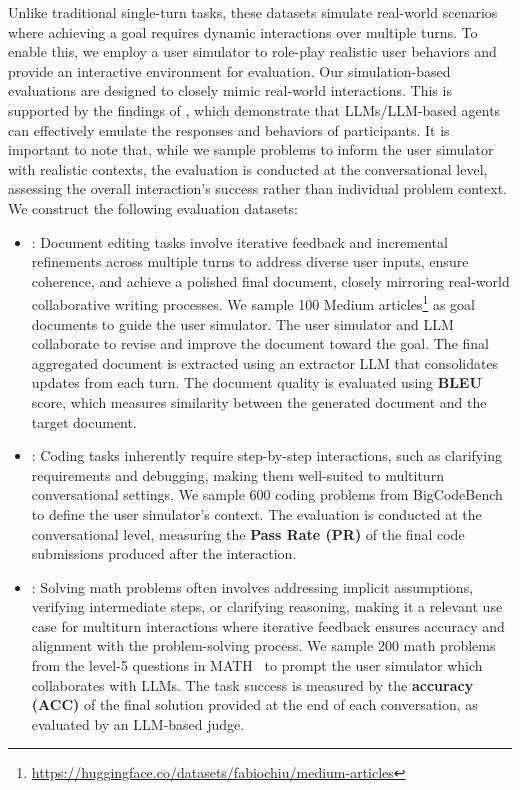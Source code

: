 Unlike traditional single-turn tasks, these datasets simulate real-world scenarios where achieving a goal requires dynamic interactions over multiple turns. To enable this, we employ a user simulator to role-play realistic user behaviors and provide an interactive environment for evaluation. Our simulation-based evaluations are designed to closely mimic real-world interactions. This is supported by the findings of \citet{simulate1000}, which demonstrate that LLMs/LLM-based agents can effectively emulate the responses and behaviors of participants. It is important to note that, while we sample problems to inform the user simulator with realistic contexts, the evaluation is conducted at the conversational level, assessing the overall interaction's success rather than individual problem context. We construct the following evaluation datasets:
%
\begin{itemize}[leftmargin=*]
    \item \textbf{\doct}: Document editing tasks involve iterative feedback and incremental refinements across multiple turns to address diverse user inputs, ensure coherence, and achieve a polished final document, closely mirroring real-world collaborative writing processes. We sample 100 Medium articles\footnote{\url{https://huggingface.co/datasets/fabiochiu/medium-articles}} as goal documents to guide the user simulator. The user simulator and LLM collaborate to revise and improve the document toward the goal. The final aggregated document is extracted using an extractor LLM that consolidates updates from each turn. The document quality is evaluated using \textbf{{BLEU}} score, which measures similarity between the generated document and the target document.
    
    \item \textbf{\codet}: Coding tasks inherently require step-by-step interactions, such as clarifying requirements and debugging, making them well-suited to multiturn conversational settings. We sample 600 coding problems from BigCodeBench~\citep{bigcodebench} to define the user simulator's context. The evaluation is conducted at the conversational level, measuring the \textbf{{Pass Rate (PR)}} of the final code submissions produced after the interaction.
    \item \textbf{\mathct}: Solving math problems often involves addressing implicit assumptions, verifying intermediate steps, or clarifying reasoning, making it a relevant use case for multiturn interactions where iterative feedback ensures accuracy and alignment with the problem-solving process. We sample 200 math problems from the level-5 questions in MATH~\citep{math} to prompt the user simulator which collaborates with LLMs. The task success is measured by the \textbf{{accuracy (ACC})} of the final solution provided at the end of each conversation, as evaluated by an LLM-based judge.
    

\end{itemize}


